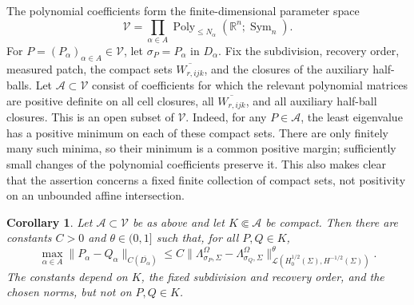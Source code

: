 \documentclass[11pt,oneside]{article}
\newtheorem{corollary}[theorem]{Corollary}
\newcommand{\R}{\mathbb R}
\newcommand{\DN}{\Lambda}
\newcommand{\Sym}{\operatorname{Sym}}
\begin{document}
The polynomial coefficients form the finite-dimensional parameter space
\begin{equation}
  \mathcal V=\prod_{\alpha\in A}
  \operatorname{Poly}_{\le N_\alpha}(\R^n;\Sym_n).
\end{equation}
For \(P=(P_\alpha)_{\alpha\in A}\in\mathcal V\), let \(\sigma_P=P_\alpha\)
in \(D_\alpha\).  Fix the subdivision, recovery order, measured patch, the
compact sets \(\overline{W_{r,ijk}}\), and the closures of the auxiliary
half-balls.  Let \(\mathcal A\subset\mathcal V\) consist of coefficients for
which the relevant polynomial matrices are positive definite on all cell
closures, all \(\overline{W_{r,ijk}}\), and all auxiliary half-ball closures.
This is an open subset of \(\mathcal V\).  Indeed, for any
\(P\in\mathcal A\), the least eigenvalue has a positive minimum on each of
these compact sets.  There are only finitely many such minima, so their minimum
is a common positive margin; sufficiently small changes of the polynomial
coefficients preserve it.  This also makes clear that the assertion concerns a
fixed finite collection of compact sets, not positivity on an unbounded affine
intersection.

\begin{corollary}
\label{cor:holder-stability}
Let \(\mathcal A\subset\mathcal V\) be as above and let
\(K\Subset \mathcal A\) be compact.  Then there are constants
\(C>0\) and \(\theta\in(0,1]\) such that, for all \(P,Q\in K\),
\begin{equation}
  \max_{\alpha\in A}
  \|P_\alpha-Q_\alpha\|_{C(\overline{D_\alpha})}
  \le
  C\bigl\|
  \DN^\Omega_{\sigma_P,\Sigma}
  -\DN^\Omega_{\sigma_Q,\Sigma}
  \bigr\|_{\mathcal L(H^{1/2}_0(\Sigma),H^{-1/2}(\Sigma))}^{\theta}.
  \label{eq:holder-stability-corollary}
\end{equation}
The constants depend on \(K\), the fixed subdivision and recovery order, and the
chosen norms, but not on \(P,Q\in K\).
\end{corollary}
\end{document}
